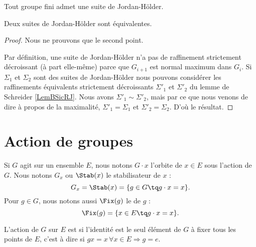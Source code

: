 \begin{theorem}\label{ThoLgxWIC}
    Tout groupe fini admet une suite de Jordan-Hölder.

    Deux suites de Jordan-Hölder sont équivalentes.
\end{theorem}

\begin{proof}
    Nous ne prouvons que le second point.

    Par définition, une suite de Jordan-Hölder n'a pas de raffinement strictement décroissant (à part elle-même) parce que \( G_{i+1}\) est normal maximum dans \( G_i\). Si \( \Sigma_1\) et \( \Sigma_2\) sont des suites de Jordan-Hölder nous pouvons considérer les raffinements équivalents strictement décroissants \( \Sigma'_1\) et \( \Sigma'_2\) du lemme de Schreider \ref{LemBSicRJ}. Nous avons \( \Sigma'_1\sim\Sigma'_2\), mais par ce que nous venons de dire à propos de la maximalité, \( \Sigma'_1=\Sigma_1\) et \( \Sigma'_2=\Sigma_2\). D'où le résultat.
\end{proof}

\section{Action de groupes}

Si \( G\) agit sur un ensemble \( E\), nous notons \( G\cdot x\) l'orbite de \( x\in E\) sous l'action de $G$. Nous notons \( G_x\) ou \( \Stab(x)\) le stabilisateur de \( x\) :
\begin{equation}
    G_x=\Stab(x)=\{ g\in G\tq g\cdot x=x \}.
\end{equation}
Pour \( g\in G\), nous notons aussi \( \Fix(g)\) le  de \( g\) :
\begin{equation}
    \Fix(g)=\{ x\in E\tq g\cdot x=x \}.
\end{equation}

\begin{definition}  \label{DefuyYJRh}
    L'action de \( G\) sur \( E\) est  si l'identité est le seul élément de \( G\) à fixer tous les points de \( E\), c'est à dire si \( gx=x\,\forall x\in E\Rightarrow g=e\).
\end{definition}

